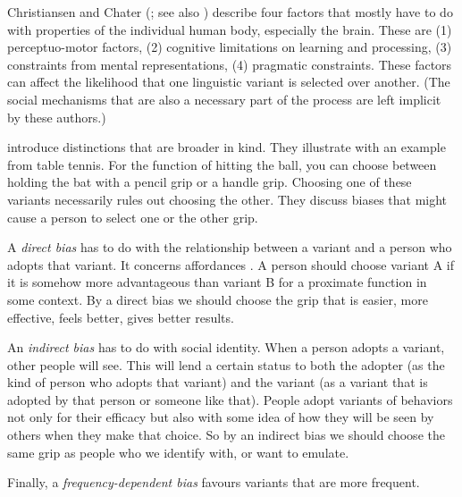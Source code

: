 Christiansen and Chater (\citeyear{christiansen_language_2008}; see also \citealt{chater_language_2010}) describe four factors that mostly have to do with properties of the 
individual human body, especially the brain. These are (1) perceptuo-motor 
factors, (2) cognitive limitations on learning and processing, (3) 
constraints from mental representations, (4) pragmatic constraints. 
These factors can affect the likelihood that one linguistic variant is 
selected over another. (The social mechanisms that are also a 
necessary part of the process are left implicit by these authors.) 



\citet{boyd_culture_1985} introduce distinctions that are 
broader in kind. They illustrate with an example from table tennis. For 
the function of hitting the ball, you can choose between holding the bat 
with a pencil grip or a handle grip. Choosing one of these variants 
necessarily rules out choosing the other. They discuss biases 
that might cause a person to select one or the other grip. 



A \textit{direct bias} has to do with the relationship between a variant 
and a person who adopts that variant. It concerns affordances \citep{gibson_ecological_1979}. A person should choose variant A if it is somehow more advantageous 
than variant B for a proximate function in some context. By a 
direct bias we should choose the grip that is easier, more effective, 
feels better, gives better results. 



An \textit{indirect bias} has to do with social 
identity. When a person adopts a variant, other people will see. This will lend a certain status to both the adopter (as 
the kind of person who adopts that variant) and the variant (as a 
variant that is adopted by that person or someone like that). People adopt 
variants of behaviors not only for their efficacy but also 
with some idea of how they will be seen by others when they make that 
choice. So by an indirect bias we should choose the same grip as people 
who we identify with, or want to emulate. 



Finally, a \textit{frequency-dependent bias} favours variants that are 
more frequent. 



